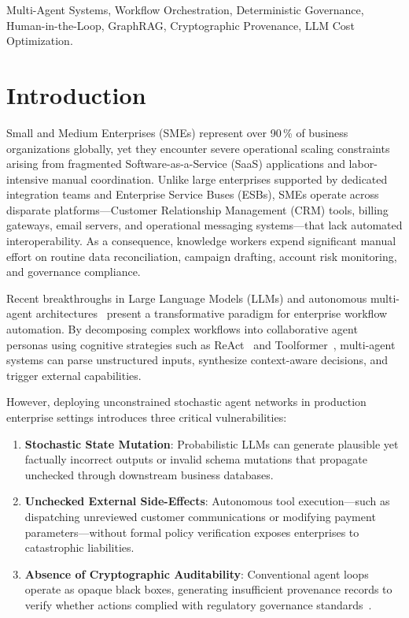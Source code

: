 \documentclass[conference]{IEEEtran}
\begin{document}
\begin{IEEEkeywords}
Multi-Agent Systems, Workflow Orchestration, Deterministic Governance, Human-in-the-Loop, GraphRAG, Cryptographic Provenance, LLM Cost Optimization.
\end{IEEEkeywords}

\section{Introduction}

Small and Medium Enterprises (SMEs) represent over 90\,\% of business organizations globally, yet they encounter severe operational scaling constraints arising from fragmented Software-as-a-Service (SaaS) applications and labor-intensive manual coordination. Unlike large enterprises supported by dedicated integration teams and Enterprise Service Buses (ESBs), SMEs operate across disparate platforms---Customer Relationship Management (CRM) tools, billing gateways, email servers, and operational messaging systems---that lack automated interoperability. As a consequence, knowledge workers expend significant manual effort on routine data reconciliation, campaign drafting, account risk monitoring, and governance compliance.

Recent breakthroughs in Large Language Models (LLMs) and autonomous multi-agent architectures~\cite{wang2023survey, wu2023autogen} present a transformative paradigm for enterprise workflow automation. By decomposing complex workflows into collaborative agent personas using cognitive strategies such as ReAct~\cite{yao2022react} and Toolformer~\cite{schick2023toolformer}, multi-agent systems can parse unstructured inputs, synthesize context-aware decisions, and trigger external capabilities.

However, deploying unconstrained stochastic agent networks in production enterprise settings introduces three critical vulnerabilities:
\begin{enumerate}
    \item \textbf{Stochastic State Mutation}: Probabilistic LLMs can generate plausible yet factually incorrect outputs or invalid schema mutations that propagate unchecked through downstream business databases.
    \item \textbf{Unchecked External Side-Effects}: Autonomous tool execution---such as dispatching unreviewed customer communications or modifying payment parameters---without formal policy verification exposes enterprises to catastrophic liabilities.
    \item \textbf{Absence of Cryptographic Auditability}: Conventional agent loops operate as opaque black boxes, generating insufficient provenance records to verify whether actions complied with regulatory governance standards~\cite{simmhan2005survey}.
\end{enumerate}
\end{document}
